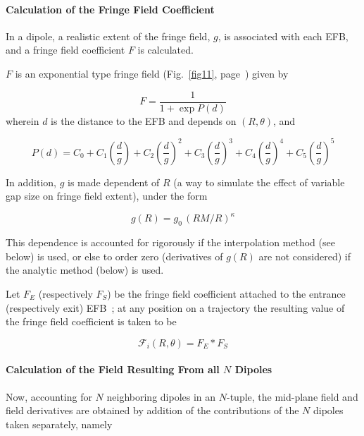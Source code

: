 \paragraph{Calculation of the Fringe Field Coefficient} 

\noindent In a dipole, a realistic extent of the fringe field, $g $, 
is associated with  each EFB, and a fringe field coefficient $ F $ is calculated. 


\bigskip

\noindent$ F $ is an exponential type fringe field (Fig.~\ref{fig11}, page~\pageref{fig11}) 
given by~\cite{Biblio12}     %

$$ F = \dfrac{1 }{ 1+ \exp P(d)} $$
%
 wherein $ d $ is the distance to the EFB and depends on $(R,\theta)$, and 

$$
    P(d) = C_0
       +C_1 \left(  \dfrac{d }{ g } \right) 
       +C_2 \left( \dfrac{d }{ g } \right)^2 
       + C_3 \left( \dfrac{d }{ g } \right)^3 
       +C_4 \left( \dfrac{d }{ g } \right)^4 
       + C_5 \left(\dfrac{d }{ g } \right)^5 $$

\noindent In addition,   $g$ is made dependent  of $R$ 
(a way to simulate the effect of variable gap size on fringe field extent), 
under the form 

$$ g(R) = g_0 \, (RM/R)^{\kappa}  $$

\noindent  This dependence is accounted for rigorously if the interpolation method (see below) is 
used, or else to  order zero (derivatives of $g(R)$ are not considered) if the analytic method 
(below) is used. 

\smallskip

\noindent Let $ F_E $ (respectively $ F_S$)  be the fringe field
coefficient attached to the entrance (respectively exit) EFB~; at any position on  a 
trajectory the resulting value of the fringe field coefficient is taken to be 

\begin{equation}
\label{EqFFdips}
  \mathcal{F}_i(R,\theta) = F_E  \ast  F_S 
\end{equation}



\paragraph{Calculation of the  Field Resulting From all $N$ Dipoles \label{FFatAP}}

 
\noindent Now, accounting for   $N$ neighboring dipoles in an $N$-tuple,  the mid-plane field  and field derivatives  
are  obtained by addition of  the  contributions of the $N$ dipoles taken separately, namely

